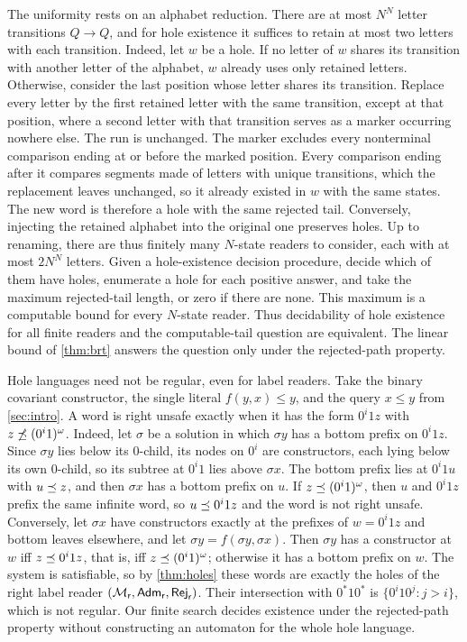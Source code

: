 The uniformity rests on an alphabet reduction. There are at most $N^N$
letter transitions $Q\to Q$, and for hole existence it suffices to retain
at most two letters with each transition. Indeed, let $w$ be a hole. If no
letter of $w$ shares its transition with another letter of the alphabet,
$w$ already uses only retained letters. Otherwise, consider the last
position whose letter shares its transition. Replace every letter by the
first retained letter with the same transition, except at that position,
where a second letter with that transition serves as a marker occurring
nowhere else. The run is unchanged. The marker excludes every nonterminal
comparison ending at or before the marked position. Every comparison ending
after it compares segments made of letters with unique transitions, which
the replacement leaves unchanged, so it already existed in $w$ with the same
states. The new word is therefore a hole with the same rejected tail.
Conversely, injecting the retained alphabet into the original one preserves
holes. Up to renaming, there are thus finitely many $N$-state readers to
consider, each with at most $2N^N$ letters. Given a hole-existence decision
procedure, decide which of them have holes, enumerate a hole for each
positive answer, and take the maximum rejected-tail length, or zero if
there are none. This maximum is a computable bound for every $N$-state
reader. Thus decidability of hole existence for all finite readers and the
computable-tail question are equivalent. The linear bound of \cref{thm:brt}
answers the question only under the rejected-path property.

Hole languages need not be regular, even for label readers. Take the
binary covariant constructor, the single literal $f(y,x)\le y$, and the
query $x\le y$ from \cref{sec:intro}. A word is right unsafe exactly when it
has the form $0^i1z$ with $z\not\preceq(0^i1)^\omega$. Indeed, let $\sigma$ be a
solution in which $\sigma y$ has a bottom prefix on $0^i1z$. Since $\sigma y$
lies below its $0$-child, its nodes on $0^i$ are constructors, each lying
below its own $0$-child, so its subtree at $0^i1$ lies above $\sigma x$. The
bottom prefix lies at $0^i1u$ with $u\preceq z$, and then $\sigma x$ has a
bottom prefix on $u$. If $z\preceq(0^i1)^\omega$, then $u$ and $0^i1z$ prefix
the same infinite word, so $u\preceq 0^i1z$ and the word is not right unsafe.
Conversely, let $\sigma x$ have constructors exactly at the prefixes of
$w=0^i1z$ and bottom leaves elsewhere, and let $\sigma y=f(\sigma y,\sigma
x)$. Then $\sigma y$ has a constructor at $w$ iff $z\preceq 0^i1z$, that is,
iff $z\preceq(0^i1)^\omega$; otherwise it has a bottom prefix on $w$. The
system is satisfiable, so by \cref{thm:holes} these words are exactly the
holes of the right label reader
$(\mathcal{M}_{\mathsf r},\mathsf{Adm}_{\mathsf r},\mathsf{Rej}_{\mathsf r})$. Their
intersection with $0^*10^*$ is $\{0^i10^j: j>i\}$, which is not regular.
Our finite search decides existence under the rejected-path property
without constructing an automaton for the whole hole language.

